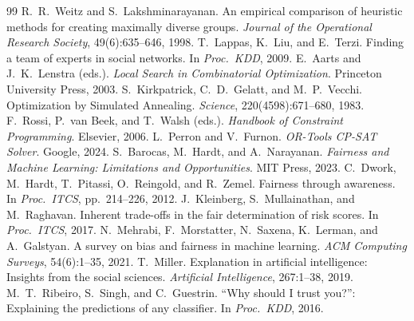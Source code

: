 \documentclass[11pt]{article}
\begin{document}
\begin{thebibliography}{99}
 R.~R.~Weitz and S.~Lakshminarayanan. An empirical comparison of heuristic
methods for creating maximally diverse groups. \emph{Journal of the Operational Research
Society}, 49(6):635--646, 1998.
 T.~Lappas, K.~Liu, and E.~Terzi. Finding a team of experts in social
networks. In \emph{Proc.\ KDD}, 2009.
 E.~Aarts and J.~K.~Lenstra (eds.). \emph{Local Search in Combinatorial
Optimization}. Princeton University Press, 2003.
 S.~Kirkpatrick, C.~D.~Gelatt, and M.~P.~Vecchi. Optimization by Simulated
Annealing. \emph{Science}, 220(4598):671--680, 1983.
 F.~Rossi, P.~van Beek, and T.~Walsh (eds.). \emph{Handbook of Constraint
Programming}. Elsevier, 2006.
 L.~Perron and V.~Furnon. \emph{OR-Tools CP-SAT Solver}. Google, 2024.
 S.~Barocas, M.~Hardt, and A.~Narayanan. \emph{Fairness and Machine
Learning: Limitations and Opportunities}. MIT Press, 2023.
 C.~Dwork, M.~Hardt, T.~Pitassi, O.~Reingold, and R.~Zemel. Fairness through
awareness. In \emph{Proc.\ ITCS}, pp.\ 214--226, 2012.
 J.~Kleinberg, S.~Mullainathan, and M.~Raghavan. Inherent trade-offs in
the fair determination of risk scores. In \emph{Proc.\ ITCS}, 2017.
 N.~Mehrabi, F.~Morstatter, N.~Saxena, K.~Lerman, and A.~Galstyan. A survey
on bias and fairness in machine learning. \emph{ACM Computing Surveys}, 54(6):1--35, 2021.
 T.~Miller. Explanation in artificial intelligence: Insights from the social
sciences. \emph{Artificial Intelligence}, 267:1--38, 2019.
 M.~T.~Ribeiro, S.~Singh, and C.~Guestrin. ``Why should I trust you?'':
Explaining the predictions of any classifier. In \emph{Proc.\ KDD}, 2016.
\end{thebibliography}
\end{document}
